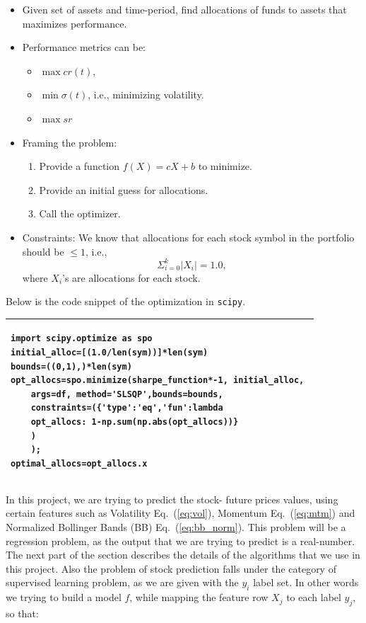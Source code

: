 \documentclass[12pt]{article}
\begin{document}
\begin{itemize}
\begin{itemize}
\item Given set of assets and time-period, find allocations of funds to assets that maximizes performance.
\item Performance metrics can be:
\begin{itemize}
\item $\max cr(t)$,
\item $\min \sigma(t)$, i.e., minimizing volatility.
\item $\max sr$
\end{itemize}
\item Framing the problem:
\begin{enumerate}
\item Provide a function $f(X)=cX+b$ to minimize.
\item Provide an initial guess for allocations.
\item Call the optimizer.
\end{enumerate}
\item Constraints: We know that allocations for each stock symbol in the portfolio should be $\leq 1$, i.e.,
\[ \Sigma_{i=0}^{k} |X_i|=1.0,
	\]
where $X_i$'s are allocations for each stock.
\end{itemize}

Below is the code snippet of the optimization in \texttt{scipy}.

\begin{tabular}{@{}|p{12.5cm}|@{}}
\hline
\begin{verbatim}
import scipy.optimize as spo
initial_alloc=[(1.0/len(sym))]*len(sym) 
bounds=((0,1),)*len(sym) 
opt_allocs=spo.minimize(sharpe_function*-1, initial_alloc, 
	args=df, method='SLSQP',bounds=bounds,
	constraints=({'type':'eq','fun':lambda
	opt_allocs: 1-np.sum(np.abs(opt_allocs))}
	)
	); 
optimal_allocs=opt_allocs.x 
\end{verbatim}
\\
\hline
\end{tabular}


\vspace{0.2in}

In this project, we are trying to predict the stock- future prices values, using certain features such as  Volatility Eq.~(\ref{eq:vol}), Momentum Eq.~(\ref{eq:mtm}) and Normalized Bollinger Bands (BB) Eq.~(\ref{eq:bb_norm}). This problem will be a regression problem, as the output that we are trying to predict is a real-number. The next part of the section describes the details of the algorithms that we use in this project. Also the problem of stock prediction falls under the category of supervised learning problem, as we are given with the $y_i$ label set. In other words we trying to build a model $f$, while mapping the feature row $X_j$ to each label $y_j$, so that:


\end{itemize}
\end{document}
